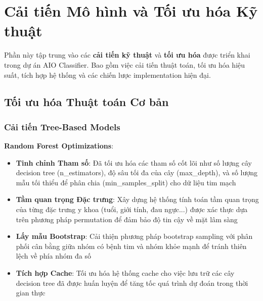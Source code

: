 \section{Cải tiến Mô hình và Tối ưu hóa Kỹ thuật}\label{sec:model-improvements}

\noindent
Phần này tập trung vào các \textbf{cải tiến kỹ thuật} và \textbf{tối ưu hóa} được triển khai trong dự án AIO Classifier. Bao gồm việc cải tiến thuật toán, tối ưu hóa hiệu suất, tích hợp hệ thống và các chiến lược implementation hiện đại.

\subsection{Tối ưu hóa Thuật toán Cơ bản}\label{subsec:basic-algorithm-optimization}

\subsubsection{Cải tiến Tree-Based Models}

\textbf{Random Forest Optimizations}:
\begin{itemize}
    \item \textbf{Tinh chỉnh Tham số}: Đã tối ưu hóa các tham số cốt lõi như số lượng cây decision tree (n\_estimators), độ sâu tối đa của cây (max\_depth), và số lượng mẫu tối thiểu để phân chia (min\_samples\_split) cho dữ liệu tim mạch
    \item \textbf{Tầm quan trọng Đặc trưng}: Xây dựng hệ thống tính toán tầm quan trọng của từng đặc trưng y khoa (tuổi, giới tính, đau ngực...) được xác thực dựa trên phương pháp permutation để đảm bảo độ tin cậy về mặt lâm sàng
    \item \textbf{Lấy mẫu Bootstrap}: Cải thiện phương pháp bootstrap sampling với phân phối cân bằng giữa nhóm có bệnh tim và nhóm khỏe mạnh để tránh thiên lệch về phía nhóm đa số
    \item \textbf{Tích hợp Cache}: Tối ưu hóa hệ thống cache cho việc lưu trữ các cây decision tree đã được huấn luyện để tăng tốc quá trình dự đoán trong thời gian thực
\end{itemize}

